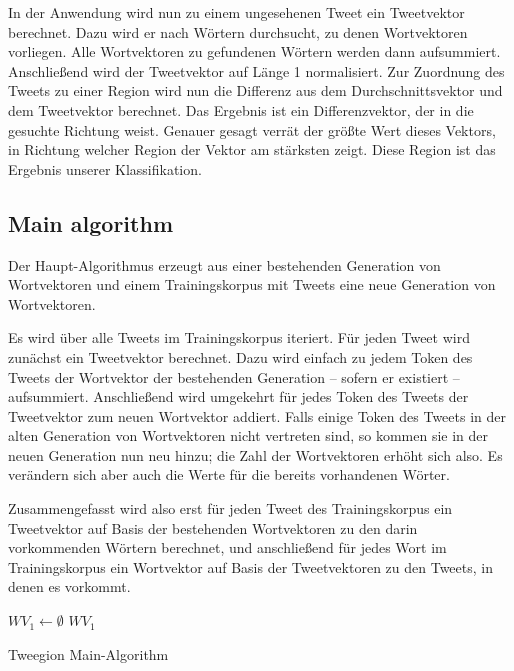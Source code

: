 \documentclass[../Main.tex]{subfiles}
\begin{document}
In der Anwendung wird nun zu einem ungesehenen Tweet ein Tweetvektor berechnet. Dazu wird er nach Wörtern durchsucht, zu denen Wortvektoren vorliegen. Alle Wortvektoren zu gefundenen Wörtern werden dann aufsummiert.
Anschließend wird der Tweetvektor auf Länge 1 normalisiert. Zur Zuordnung des Tweets zu einer Region wird nun die Differenz aus dem Durchschnittsvektor und dem Tweetvektor berechnet. Das Ergebnis ist ein Differenzvektor, der in die gesuchte Richtung weist. Genauer gesagt verrät der größte Wert dieses Vektors, in Richtung welcher Region der Vektor am stärksten zeigt. Diese Region ist das Ergebnis unserer Klassifikation.

\subsection{Main algorithm}
Der Haupt-Algorithmus erzeugt aus einer bestehenden Generation von Wortvektoren und einem Trainingskorpus mit Tweets eine neue Generation von Wortvektoren.

Es wird über alle Tweets im Trainingskorpus iteriert. Für jeden Tweet wird zunächst ein Tweetvektor berechnet. Dazu wird einfach zu jedem Token des Tweets der Wortvektor der bestehenden Generation -- sofern er existiert -- aufsummiert. Anschließend wird umgekehrt für jedes Token des Tweets der Tweetvektor zum neuen Wortvektor addiert. Falls einige Token des Tweets in der alten Generation von Wortvektoren nicht vertreten sind, so kommen sie in der neuen Generation nun neu hinzu; die Zahl der Wortvektoren erhöht sich also. Es verändern sich aber auch die Werte für die bereits vorhandenen Wörter.

Zusammengefasst wird also erst für jeden Tweet des Trainingskorpus ein Tweetvektor auf Basis der bestehenden Wortvektoren zu den darin vorkommenden Wörtern berechnet, und anschließend für jedes Wort im Trainingskorpus ein Wortvektor auf Basis der Tweetvektoren zu den Tweets, in denen es vorkommt.

\begin{algorithm}[H]
 \SetAlgoLined
 $WV_1 \gets\emptyset $\; 
\Return $WV_1$\;
\caption{Tweegion Main-Algorithm}
\end{algorithm}
\end{document}
